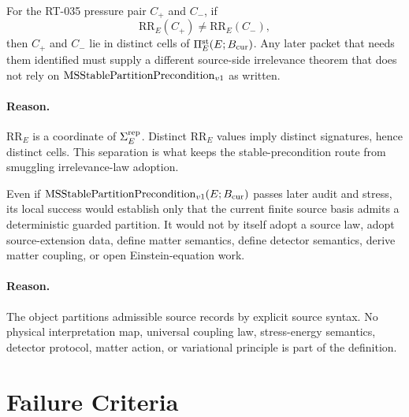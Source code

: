 \begin{proposition}
For the RT-035 pressure pair \(C_+\) and \(C_-\), if
\[
  \mathrm{RR}_E(C_+)\neq\mathrm{RR}_E(C_-),
\]
then \(C_+\) and \(C_-\) lie in distinct cells of
\(\Pi^{\mathrm{st}}_E(E;B_{\mathrm{cur}})\). Any later packet that needs them identified must supply
a different source-side irrelevance theorem that does not rely on
\(\mathrm{MSStablePartitionPrecondition}_{v1}\) as written.
\end{proposition}

\paragraph{Reason.}
\(\mathrm{RR}_E\) is a coordinate of \(\Sigma^{\mathrm{rep}}_E\). Distinct
\(\mathrm{RR}_E\) values imply distinct signatures, hence distinct cells.
This separation is what keeps the stable-precondition route from smuggling
irrelevance-law adoption.

\begin{proposition}
Even if \(\mathrm{MSStablePartitionPrecondition}_{v1}(E;B_{\mathrm{cur}})\) passes later audit and stress, its local
success would establish only that the current finite source basis admits a
deterministic guarded partition. It would not by itself adopt a source law,
adopt source-extension data, define matter semantics, define detector
semantics, derive matter coupling, or open Einstein-equation work.
\end{proposition}

\paragraph{Reason.}
The object partitions admissible source records by explicit source syntax.
No physical interpretation map, universal coupling law, stress-energy
semantics, detector protocol, matter action, or variational principle is part
of the definition.

\section{Failure Criteria}

